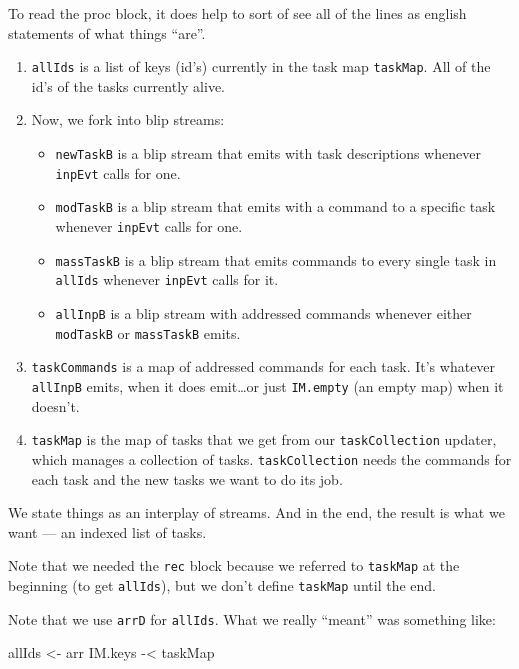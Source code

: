 \documentclass[]{article}
\newenvironment{Shaded}{}{}
\newcommand{\NormalTok}[1]{#1}
\newcommand{\OperatorTok}[1]{\textcolor[rgb]{0.40,0.40,0.40}{#1}}
\newcommand{\OtherTok}[1]{\textcolor[rgb]{0.00,0.44,0.13}{#1}}
\begin{document}
To read the proc block, it does help to sort of see all of the lines as english
statements of what things ``are''.

\begin{enumerate}
\def\labelenumi{\arabic{enumi}.}
\item
  \texttt{allIds} is a list of keys (id's) currently in the task map
  \texttt{taskMap}. All of the id's of the tasks currently alive.
\item
  Now, we fork into blip streams:

  \begin{itemize}
  \tightlist
  \item
    \texttt{newTaskB} is a blip stream that emits with task descriptions
    whenever \texttt{inpEvt} calls for one.
  \item
    \texttt{modTaskB} is a blip stream that emits with a command to a specific
    task whenever \texttt{inpEvt} calls for one.
  \item
    \texttt{massTaskB} is a blip stream that emits commands to every single task
    in \texttt{allIds} whenever \texttt{inpEvt} calls for it.
  \item
    \texttt{allInpB} is a blip stream with addressed commands whenever either
    \texttt{modTaskB} or \texttt{massTaskB} emits.
  \end{itemize}
\item
  \texttt{taskCommands} is a map of addressed commands for each task. It's
  whatever \texttt{allInpB} emits, when it does emit\ldots or just
  \texttt{IM.empty} (an empty map) when it doesn't.
\item
  \texttt{taskMap} is the map of tasks that we get from our
  \texttt{taskCollection} updater, which manages a collection of tasks.
  \texttt{taskCollection} needs the commands for each task and the new tasks we
  want to do its job.
\end{enumerate}

We state things as an interplay of streams. And in the end, the result is what
we want --- an indexed list of tasks.

Note that we needed the \texttt{rec} block because we referred to
\texttt{taskMap} at the beginning (to get \texttt{allIds}), but we don't define
\texttt{taskMap} until the end.

Note that we use \texttt{arrD} for \texttt{allIds}. What we really ``meant'' was
something like:

\begin{Shaded}
\begin{Highlighting}[]
\NormalTok{allIds }\OtherTok{\textless{}{-}}\NormalTok{ arr IM.keys }\OperatorTok{{-}\textless{}}\NormalTok{ taskMap}
\end{Highlighting}
\end{Shaded}
\end{document}
